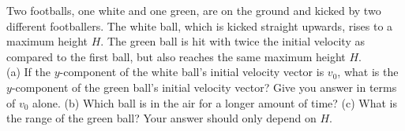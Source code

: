 Two footballs, one white and one green, are on the ground and kicked
by two different footballers. The white ball, which is kicked
straight upwards, rises to a maximum height $H$. The green ball is
hit with twice the initial velocity as compared to the first ball,
but also reaches the same maximum height $H$.\\
%
(a) If the $y$-component of the white ball's initial velocity vector
is $v_0$, what is the $y$-component of the green ball's initial
velocity vector? Give you answer in terms of $v_0$ alone.\answercheck\hwendpart
%
(b) Which ball is in the air for a longer amount of time?\answercheck\hwendpart
%
(c) What is the range of the green ball? Your answer should only
depend on $H$.\answercheck
